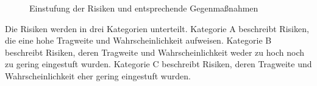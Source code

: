 \begin{figure}[H] 
  \centering
  \caption{Einstufung der Risiken und entsprechende Gegenmaßnahmen}
  \label{fig:Abbildung 2}
\end{figure}

Die Risiken werden in drei Kategorien unterteilt. Kategorie A beschreibt Risiken, die eine hohe Tragweite und Wahrscheinlichkeit aufweisen. Kategorie B beschreibt Risiken, deren Tragweite und Wahrscheinlichkeit weder zu hoch noch zu gering eingestuft wurden. Kategorie C beschreibt Risiken, deren Tragweite und Wahrscheinlichkeit eher gering eingestuft wurden.

